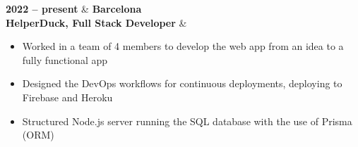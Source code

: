 \textbf{2022 – present} & \textbf{Barcelona} \\
\textbf{HelperDuck, Full Stack Developer} \faExternalLink & 
\begin{itemize}[leftmargin=0.5cm,itemsep=0pt,parsep=0pt]
\item Worked in a team of 4 members to develop the web app from an idea to a fully functional app
\item Designed the DevOps workflows for continuous deployments, deploying to Firebase and Heroku
\item Structured Node.js server running the SQL database with the use of Prisma (ORM)
\end{itemize} \\ 